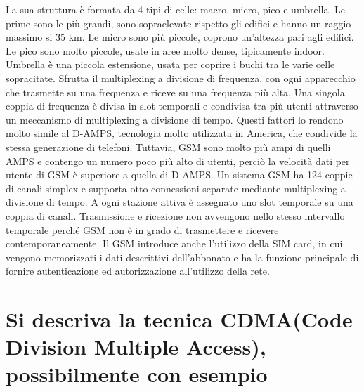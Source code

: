 La sua struttura è formata da 4 tipi di celle: macro, micro, pico e umbrella. 
Le prime sono le più grandi, sono sopraelevate rispetto gli edifici e hanno un raggio massimo si 35 km. Le micro sono più piccole, coprono un'altezza pari agli edifici. Le pico sono molto piccole, usate in aree molto dense, tipicamente indoor. Umbrella è una piccola estensione, usata per coprire i buchi tra le varie celle sopracitate.
Sfrutta il multiplexing a divisione di frequenza, con ogni apparecchio che trasmette su una frequenza e riceve su una frequenza più alta. Una singola coppia di frequenza è divisa in slot temporali e condivisa tra più utenti attraverso un meccanismo di multiplexing a divisione di tempo.
Questi fattori lo rendono molto simile al D-AMPS, tecnologia molto utilizzata in America, che condivide la stessa generazione di telefoni. Tuttavia, GSM sono molto più ampi di quelli AMPS e contengo un numero poco più alto di utenti, perciò la velocità dati per utente di GSM è superiore a quella di D-AMPS.
Un sistema GSM ha 124 coppie di canali simplex e supporta otto connessioni separate mediante multiplexing a divisione di tempo.
A ogni stazione attiva è assegnato uno slot temporale su una coppia di canali.
Trasmissione e ricezione non avvengono nello stesso intervallo temporale perché GSM non è in grado di trasmettere e ricevere contemporaneamente.
Il GSM introduce anche l’utilizzo della SIM card, in cui vengono memorizzati i dati descrittivi dell’abbonato e ha la funzione principale di fornire autenticazione ed autorizzazione all’utilizzo della rete.
\section{Si descriva la tecnica CDMA(Code Division Multiple Access), possibilmente con esempio}

